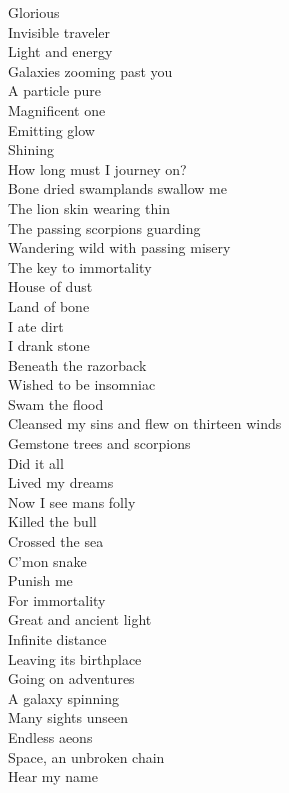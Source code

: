 Glorious \\
Invisible traveler\\
Light and energy\\
Galaxies zooming past you\\
A particle pure\\
Magnificent one\\
Emitting glow\\
Shining\\
How long must I journey on?\\

Bone dried swamplands swallow me\\
The lion skin wearing thin\\
The passing scorpions guarding\\
Wandering wild with passing misery\\
The key to immortality\\

House of dust\\
Land of bone\\
I ate dirt\\
I drank stone\\
Beneath the razorback\\
Wished to be insomniac\\
Swam the flood\\
Cleansed my sins and flew on thirteen winds\\
Gemstone trees and scorpions\\
Did it all\\
Lived my dreams\\
Now I see mans folly\\
Killed the bull\\
Crossed the sea\\
C'mon snake\\
Punish me\\
For immortality\\

Great and ancient light\\
Infinite distance\\
Leaving its birthplace\\
Going on adventures\\
A galaxy spinning\\
Many sights unseen\\
Endless aeons\\
Space, an unbroken chain\\
Hear my name\\

